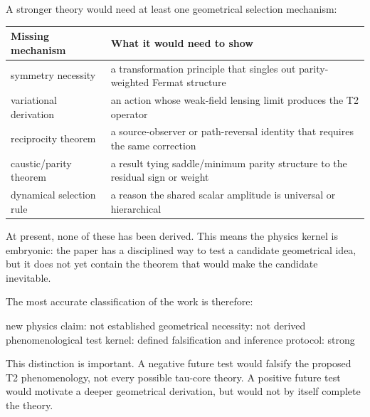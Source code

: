 \documentclass[11pt]{article}
\newenvironment{Shaded}{}{}
\newcommand{\NormalTok}[1]{#1}
\newcounter{none} %
\begin{document}
A stronger theory would need at least one geometrical selection
mechanism:

{\def\LTcaptype{none} %
\begin{longtable}[]{@{}
  >{\raggedright\arraybackslash}p{}
  >{\raggedright\arraybackslash}p{}@{}}
\toprule\noalign{}
\begin{minipage}[b]{\linewidth}\raggedright
Missing mechanism
\end{minipage} & \begin{minipage}[b]{\linewidth}\raggedright
What it would need to show
\end{minipage} \\
\midrule\noalign{}
\endhead
\bottomrule\noalign{}
\endlastfoot
symmetry necessity & a transformation principle that singles out
parity-weighted Fermat structure \\
variational derivation & an action whose weak-field lensing limit
produces the T2 operator \\
reciprocity theorem & a source-observer or path-reversal identity that
requires the same correction \\
caustic/parity theorem & a result tying saddle/minimum parity structure
to the residual sign or weight \\
dynamical selection rule & a reason the shared scalar amplitude is
universal or hierarchical \\
\end{longtable}
}

At present, none of these has been derived. This means the physics
kernel is embryonic: the paper has a disciplined way to test a candidate
geometrical idea, but it does not yet contain the theorem that would
make the candidate inevitable.

The most accurate classification of the work is therefore:

\begin{Shaded}
\begin{Highlighting}[]
\NormalTok{new physics claim: not established}
\NormalTok{geometrical necessity: not derived}
\NormalTok{phenomenological test kernel: defined}
\NormalTok{falsification and inference protocol: strong}
\end{Highlighting}
\end{Shaded}

This distinction is important. A negative future test would falsify the
proposed T2 phenomenology, not every possible tau-core theory. A
positive future test would motivate a deeper geometrical derivation, but
would not by itself complete the theory.
\end{document}
